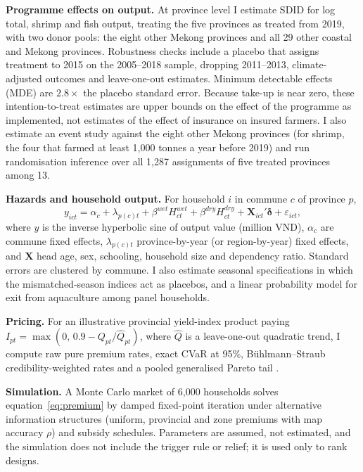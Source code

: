 \documentclass[11pt,a4paper]{article}
\begin{document}
\textbf{Programme effects on output.} At province level I estimate SDID \parencite{arkhangelsky2021} for log total, shrimp and fish output, treating the five provinces as treated from 2019, with two donor pools: the eight other Mekong provinces and all 29 other coastal and Mekong provinces. Robustness checks include a placebo that assigns treatment to 2015 on the 2005--2018 sample, dropping 2011--2013, climate-adjusted outcomes and leave-one-out estimates. Minimum detectable effects (MDE) are $2.8\times$ the placebo standard error. Because take-up is near zero, these intention-to-treat estimates are upper bounds on the effect of the programme as implemented, not estimates of the effect of insurance on insured farmers. I also estimate an event study against the eight other Mekong provinces (for shrimp, the four that farmed at least 1,000 tonnes a year before 2019) and run randomisation inference over all 1,287 assignments of five treated provinces among 13.

\textbf{Hazards and household output.} For household $i$ in commune $c$ of province $p$,
\begin{equation}
y_{ict} = \alpha_c + \lambda_{p(c)t} + \beta^{wet} H^{wet}_{ct} + \beta^{dry} H^{dry}_{ct} + \bm{X}_{ict}'\bm\delta + \varepsilon_{ict},
\label{eq:hh}
\end{equation}
where $y$ is the inverse hyperbolic sine of output value (million VND), $\alpha_c$ are commune fixed effects, $\lambda_{p(c)t}$ province-by-year (or region-by-year) fixed effects, and $\bm{X}$ head age, sex, schooling, household size and dependency ratio. Standard errors are clustered by commune. I also estimate seasonal specifications in which the mismatched-season indices act as placebos, and a linear probability model for exit from aquaculture among panel households.

\textbf{Pricing.} For an illustrative provincial yield-index product paying $I_{pt} = \max(0,\, 0.9 - Q_{pt}/\hat Q_{pt})$, where $\hat Q$ is a leave-one-out quadratic trend, I compute raw pure premium rates, exact CVaR at 95\%, Bühlmann--Straub credibility-weighted rates \parencite{buhlmann2005} and a pooled generalised Pareto tail \parencite{embrechts1997,mcneil2015,acerbi2002}.

\textbf{Simulation.} A Monte Carlo market of 6,000 households solves equation~\eqref{eq:premium} by damped fixed-point iteration under alternative information structures (uniform, provincial and zone premiums with map accuracy $\rho$) and subsidy schedules. Parameters are assumed, not estimated, and the simulation does not include the trigger rule or relief; it is used only to rank designs.
\end{document}
